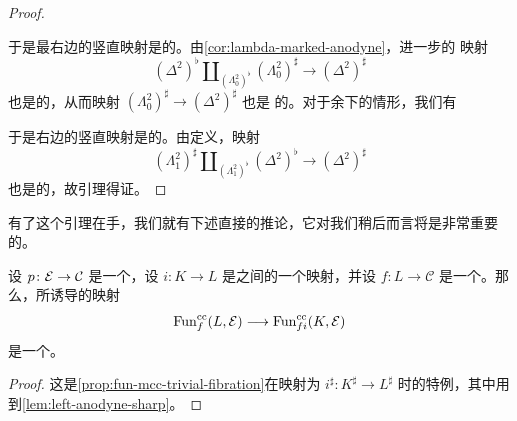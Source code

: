 \begin{proof}
\begin{center}
\end{center}
于是最右边的竖直映射是\trMarkedAnodyne{}的。由\cref{cor:lambda-marked-anodyne}，进一步的
映射
\[
(\Delta^2)^\flat \amalg_{(\Lambda^2_0)^\flat} (\Lambda^2_0)^\sharp
\longrightarrow
(\Delta^2)^\sharp
\]
也是\trMarkedAnodyne{}的，从而映射 $(\Lambda^2_0)^\sharp \to (\Delta^2)^\sharp$ 也是%
\trMarkedAnodyne{}的。对于余下的情形，我们有\trPushout{}%
\begin{center}
\end{center}
于是右边的竖直映射是\trMarkedAnodyne{}的。由定义，映射
\[
(\Lambda^2_1)^\sharp \amalg_{(\Lambda^2_1)^\flat} (\Delta^2)^\flat
\longrightarrow
(\Delta^2)^\sharp
\]
也是\trMarkedAnodyne{}的，故引理得证。
\end{proof}

有了这个引理在手，我们就有下述直接的推论，它对我们稍后而言将是非常重要的。

\begin{corollary}\label{cor:fun-cc-trivial-fibration}
设 $p\colon \mathcal{E} \to \mathcal{C}$ 是一个\trCocartesianFibration{}，设
$i\colon K \to L$ 是\trSimplicialSet{}之间的一个\trLeftAnodyne{}映射，并设
$f\colon L \to \mathcal{C}$ 是一个\trMorphism{}。那么，所诱导的映射
\[
\mathrm{Fun}^{\mathrm{cc}}_f(L, \mathcal{E})
\longrightarrow
\mathrm{Fun}^{\mathrm{cc}}_{fi}(K, \mathcal{E})
\]
是一个\trTrivialFibration{}。
\end{corollary}

\begin{proof}
这是\cref{prop:fun-mcc-trivial-fibration}在\trMarkedLeftAnodyne{}映射为 $i^\sharp\colon K^\sharp \to L^\sharp$ 时的特例，其中用到\cref{lem:left-anodyne-sharp}。
\end{proof}

